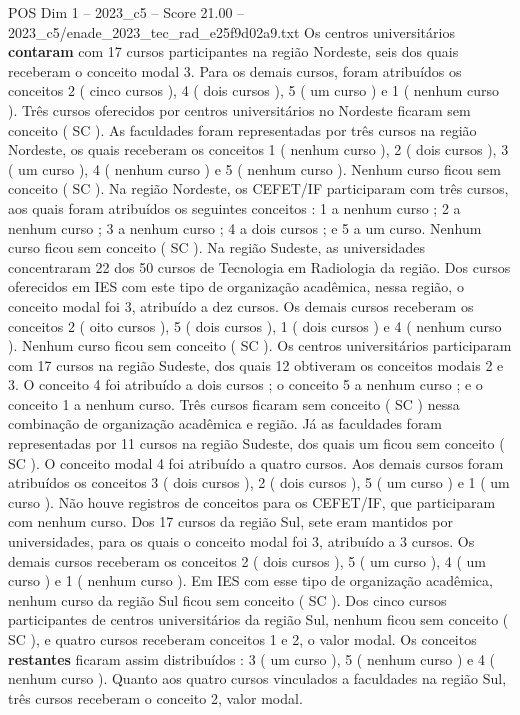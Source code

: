 \begin{textsample}{POS Dim 1 – 2023\_c5 – Score 21.00 – 2023\_c5/enade\_2023\_tec\_rad\_e25f9d02a9.txt}
Os centros universitários \textbf{contaram} com 17 cursos participantes na região Nordeste, seis dos quais receberam o conceito modal 3.
Para os demais cursos, foram atribuídos os conceitos 2 ( cinco cursos ), 4 ( dois cursos ), 5 ( um curso ) e 1 ( nenhum curso ).
Três cursos oferecidos por centros universitários no Nordeste ficaram sem conceito ( SC ).
As faculdades foram representadas por três cursos na região Nordeste, os quais receberam os conceitos 1 ( nenhum curso ), 2 ( dois cursos ), 3 ( um curso ), 4 ( nenhum curso ) e 5 ( nenhum curso ).
Nenhum curso ficou sem conceito ( SC ).
Na região Nordeste, os CEFET/IF participaram com três cursos, aos quais foram atribuídos os seguintes conceitos : 1 a nenhum curso ; 2 a nenhum curso ; 3 a nenhum curso ; 4 a dois cursos ; e 5 a um curso.
Nenhum curso ficou sem conceito ( SC ).
Na região Sudeste, as universidades concentraram 22 dos 50 cursos de Tecnologia em Radiologia da região.
Dos cursos oferecidos em IES com este tipo de organização acadêmica, nessa região, o conceito modal foi 3, atribuído a dez cursos.
Os demais cursos receberam os conceitos 2 ( oito cursos ), 5 ( dois cursos ), 1 ( dois cursos ) e 4 ( nenhum curso ).
Nenhum curso ficou sem conceito ( SC ).
Os centros universitários participaram com 17 cursos na região Sudeste, dos quais 12 obtiveram os conceitos modais 2 e 3.
O conceito 4 foi atribuído a dois cursos ; o conceito 5 a nenhum curso ; e o conceito 1 a nenhum curso.
Três cursos ficaram sem conceito ( SC ) nessa combinação de organização acadêmica e região.
Já as faculdades foram representadas por 11 cursos na região Sudeste, dos quais um ficou sem conceito ( SC ).
O conceito modal 4 foi atribuído a quatro cursos.
Aos demais cursos foram atribuídos os conceitos 3 ( dois cursos ), 2 ( dois cursos ), 5 ( um curso ) e 1 ( um curso ).
Não houve registros de conceitos para os CEFET/IF, que participaram com nenhum curso.
Dos 17 cursos da região Sul, sete eram mantidos por universidades, para os quais o conceito modal foi 3, atribuído a 3 cursos.
Os demais cursos receberam os conceitos 2 ( dois cursos ), 5 ( um curso ), 4 ( um curso ) e 1 ( nenhum curso ).
Em IES com esse tipo de organização acadêmica, nenhum curso da região Sul ficou sem conceito ( SC ).
Dos cinco cursos participantes de centros universitários da região Sul, nenhum ficou sem conceito ( SC ), e quatro cursos receberam conceitos 1 e 2, o valor modal.
Os conceitos \textbf{restantes} ficaram assim distribuídos : 3 ( um curso ), 5 ( nenhum curso ) e 4 ( nenhum curso ).
Quanto aos quatro cursos vinculados a faculdades na região Sul, três cursos receberam o conceito 2, valor modal.

\end{textsample}
